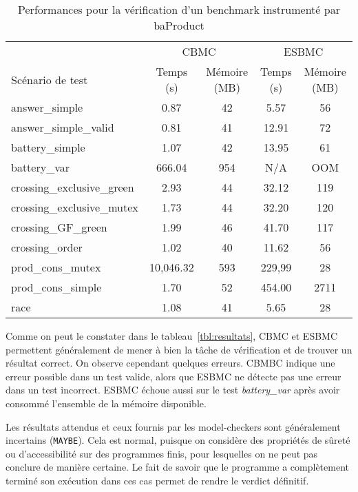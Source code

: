 \begin{table}[tbp]
\centering
\caption{Performances pour la vérification d'un benchmark instrumenté par baProduct}
\label{tbl:performances}
\begin{tabular}{|l|c|c|c|c|}
\hline
                           & \multicolumn{2}{c|}{CBMC} & \multicolumn{2}{c|}{ESBMC}\\
Scénario de test           & Temps (s) & Mémoire (MB) & Temps (s) & Mémoire (MB) \\
\hline
answer\_simple             & 0.87      & 42           & 5.57      & 56           \\
answer\_simple\_valid      & 0.81      & 41           & 12.91     & 72           \\
battery\_simple            & 1.07      & 42           & 13.95     & 61           \\
battery\_var               & 666.04    & 954          & N/A       & OOM          \\
crossing\_exclusive\_green & 2.93      & 44           & 32.12     & 119          \\
crossing\_exclusive\_mutex & 1.73      & 44           & 32.20     & 120          \\
crossing\_GF\_green        & 1.99      & 46           & 41.70     & 117          \\
crossing\_order            & 1.02      & 40           & 11.62     & 56           \\
prod\_cons\_mutex          & 10,046.32 & 593          & 229,99    & 28           \\
prod\_cons\_simple         & 1.70      & 52           & 454.00    & 2711         \\
race                       & 1.08      & 41           & 5.65      & 28           \\
\hline
\end{tabular}
\end{table}

Comme on peut le constater dans le tableau~\ref{tbl:resultats}, CBMC et ESBMC
permettent généralement de mener à bien la tâche de vérification et de trouver
un résultat correct. On observe cependant quelques erreurs. CBMBC indique une
erreur possible dans un test valide, alors que ESBMC ne détecte pas une erreur
dans un test incorrect. ESBMC échoue aussi sur le test \emph{battery\_var} après
avoir consommé l'ensemble de la mémoire disponible.

Les résultats attendus et ceux fournis par les model-checkers sont généralement
incertains (\texttt{MAYBE}). Cela est normal, puisque on considère des
propriétés de sûreté ou d'accessibilité sur des programmes finis, pour
lesquelles on ne peut pas conclure de manière certaine. Le fait de savoir que le
programme a complètement terminé son exécution dans ces cas permet de rendre le
verdict définitif.

